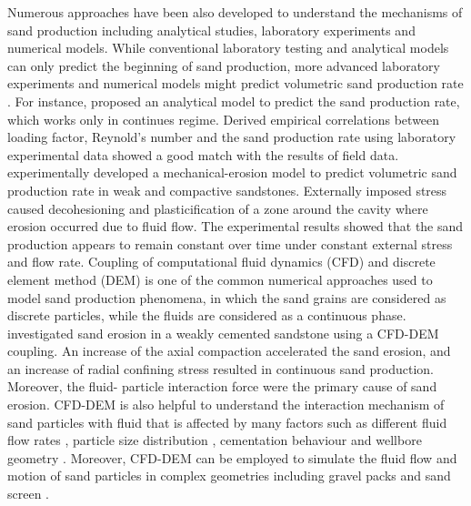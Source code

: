 \documentclass{article}
\begin{document}
Numerous approaches have been also developed to understand the mechanisms of sand production including analytical studies, laboratory experiments and numerical models. While conventional laboratory testing and analytical models can only predict the beginning of sand production, more advanced laboratory experiments and numerical models might predict volumetric sand production rate \citep{rahmati2013review}. For instance, \cite{willson2002new} proposed an analytical model to predict the sand production rate, which works only in continues regime. Derived empirical correlations between  loading factor, Reynold’s number and the sand production rate using laboratory experimental data showed a good match with the results of field data. \cite{papamichos2001volumetric} experimentally developed a mechanical-erosion model to predict volumetric sand production rate in weak and compactive sandstones. Externally imposed stress caused decohesioning and plasticification of a zone around the cavity where erosion occurred due to fluid flow. The experimental results showed that the sand production appears to remain constant over time under constant external stress and flow rate. Coupling of computational fluid dynamics (CFD) and discrete element method (DEM) \citep{tsuji1993discrete} is one of the common numerical approaches used to model sand production phenomena, in which the sand grains are considered as discrete particles, while the fluids are considered as a continuous phase. \cite{zhou2011numerical} investigated sand erosion in a weakly cemented sandstone using a CFD-DEM coupling. An increase of the axial compaction accelerated the sand erosion,  and an increase of radial confining stress resulted in continuous sand production. Moreover, the fluid- particle interaction force were the primary cause of sand erosion. CFD-DEM is also helpful to understand the interaction mechanism of sand particles with fluid that is affected by many factors such as different fluid flow rates \citep{ma2021cfd}, particle size distribution \citep{zhao2013coupled}, cementation behaviour \citep{fang2022cfd} and wellbore geometry \citep{zhang2019proppant}. Moreover, CFD-DEM can be employed to simulate the fluid flow and motion of sand particles in complex geometries including gravel packs \citep{wang2022microscopic} and sand screen \citep{ismail2021cfd}.
 
\end{document}

